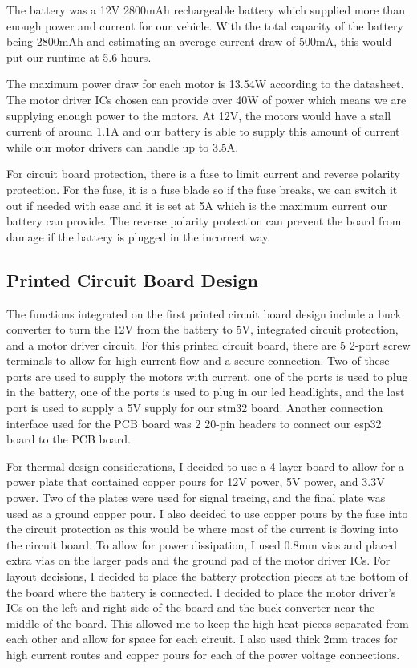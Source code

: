 \documentclass[11pt]{article}
\begin{document}
The battery was a 12V 2800mAh rechargeable battery which supplied more than enough power and current for our vehicle. With the total capacity of the battery being 2800mAh and estimating an average current draw of 500mA, this would put our runtime at 5.6 hours.

The maximum power draw for each motor is 13.54W according to the datasheet. The motor driver ICs chosen can provide over 40W of power which means we are supplying enough power to the motors. At 12V, the motors would have a stall current of around 1.1A and our battery is able to supply this amount of current while our motor drivers can handle up to 3.5A.

For circuit board protection, there is a fuse to limit current and reverse polarity protection. For the fuse, it is a fuse blade so if the fuse breaks, we can switch it out if needed with ease and it is set at 5A which is the maximum current our battery can provide. The reverse polarity protection can prevent the board from damage if the battery is plugged in the incorrect way.

\subsection{Printed Circuit Board Design}
The functions integrated on the first printed circuit board design include a buck converter to turn the 12V from the battery to 5V, integrated circuit protection, and a motor driver circuit. For this printed circuit board, there are 5 2-port screw terminals to allow for high current flow and a secure connection. Two of these ports are used to supply the motors with current, one of the ports is used to plug in the battery, one of the ports is used to plug in our led headlights, and the last port is used to supply a 5V supply for our stm32 board. Another connection interface used for the PCB board was 2 20-pin headers to connect our esp32 board to the PCB board.

For thermal design considerations, I decided to use a 4-layer board to allow for a power plate that contained copper pours for 12V power, 5V power, and 3.3V power.  Two of the plates were used for signal tracing, and the final plate was used as a ground copper pour. I also decided to use copper pours by the fuse into the circuit protection as this would be where most of the current is flowing into the circuit board. To allow for power dissipation, I used 0.8mm vias and placed extra vias on the larger pads and the ground pad of the motor driver ICs. For layout decisions, I decided to place the battery protection pieces at the bottom of the board where the battery is connected. I decided to place the motor driver's ICs on the left and right side of the board and the buck converter near the middle of the board. This allowed me to keep the high heat pieces separated from each other and allow for space for each circuit. I also used thick 2mm traces for high current routes and copper pours for each of the power voltage connections.
\end{document}
